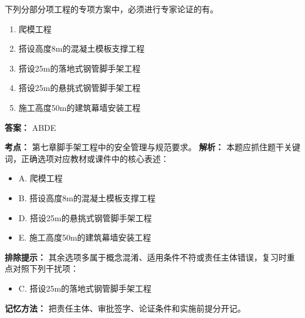 \documentclass[UTF8,fontset=fandol,11pt]{ctexart}
\begin{document}
\begin{quizbox}[title={第 8 题}]
下列分部分项工程的专项方案中，必须进行专家论证的有。\\
\begin{enumerate}[label=\Alph*.]
\item 爬模工程
\item 搭设高度8m的混凝土模板支撑工程
\item 搭设25m的落地式钢管脚手架工程
\item 搭设25m的悬挑式钢管脚手架工程
\item 施工高度50m的建筑幕墙安装工程
\end{enumerate}
\textbf{答案：} ABDE
\vspace{0.25em}
\begin{answerbox}[title={考点解析}]
\textbf{考点：} 第七章脚手架工程中的安全管理与规范要求。
\textbf{解析：} 本题应抓住题干关键词，正确选项对应教材或课件中的核心表述：
\begin{itemize}
\item A. 爬模工程
\item B. 搭设高度8m的混凝土模板支撑工程
\item D. 搭设25m的悬挑式钢管脚手架工程
\item E. 施工高度50m的建筑幕墙安装工程
\end{itemize}
\textbf{排除提示：} 其余选项多属于概念混淆、适用条件不符或责任主体错误，复习时重点对照下列干扰项：
\begin{itemize}
\item C. 搭设25m的落地式钢管脚手架工程
\end{itemize}
\textbf{记忆方法：} 把责任主体、审批签字、论证条件和实施前提分开记。
\end{answerbox}
\end{quizbox}
\end{document}
